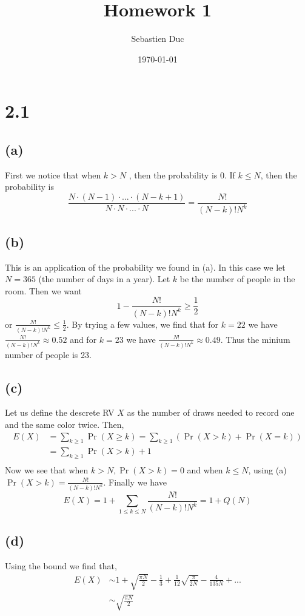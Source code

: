 \documentclass[12pt,a4paper]{article}
\title{Homework 1}
\author{Sebastien Duc}
\date{\today}
\begin{document}
\maketitle
\section*{2.1}
\subsection*{(a)}
First we notice that when $k > N$ , then the probability is 0. 
If $k \leq N$, then the probability is
\[
    \frac{N\cdot(N-1)\cdot...\cdot(N-k+1)}{N\cdot N \cdot ... \cdot N} = \frac{N!}{(N-k)!N^k}
\]

\subsection*{(b)}
This is an application of the probability we found in (a). In this case we let $N=365$ (the number of days in a year).
Let $k$ be the number of people in the room. Then we want
\[
    1 - \frac{N!}{(N-k)!N^k} \geq \frac 1 2
\]
or $\frac{N!}{(N-k)!N^k} \leq \frac 1 2$. By trying a few values, we find that for $k=22$ we have $\frac{N!}{(N-k)!N^k} \approx 0.52$ and for 
$k = 23$ we have $\frac{N!}{(N-k)!N^k} \approx 0.49$. Thus the minium number of people is 23.

\subsection*{(c)}
Let us define the descrete RV $X$ as the number of draws needed to record one and the same color twice.
Then,
\[
    \begin{split}
        E(X) &= \sum_{k \geq 1}{\Pr(X \geq k)} = \sum_{k \geq  1}{\left(\Pr(X > k) + \Pr(X = k)\right)}\\
             &= \sum_{k \geq 1}{\Pr(X > k)} + 1\\
    \end{split}
\]
Now we see that when $k > N, \Pr(X>k) = 0$ and when $k \leq N$, using (a) $\Pr(X > k) = \frac{N!}{(N-k)!N^k}$. Finally we have
\[
    E(X) = 1 + \sum_{1\leq k \leq N}{\frac{N!}{(N-k)!N^k}} = 1 + Q(N)
\]

\subsection*{(d)}
Using the bound we find that,
\[
    \begin{split}
        E(X) &\sim 1 + \sqrt{\frac{\pi N}2} -\frac 1 3 + \frac 1 {12} \sqrt{\frac{\pi}{2 N}} - \frac 4 {135 N} + ...\\
             &\sim \sqrt{\frac{\pi N}2} 
    \end{split}
\]
\end{document}
